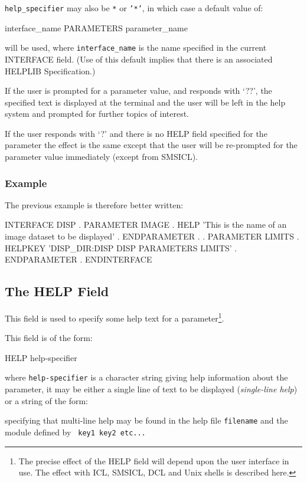 \documentclass[twoside,11pt,nolof]{starlink}
\begin{document}
\texttt{help\_specifier}  may also be \texttt{*} or \texttt{'*'}, in which case a
default value of:
\begin{terminalv}
interface_name PARAMETERS parameter_name
\end{terminalv}
will be used, where \texttt{interface\_name} is the name specified in the
current INTERFACE field.
(Use of this default implies that there is an associated HELPLIB Specification.)

If the user is prompted for a parameter value, and responds with `??',
the specified text is displayed at the terminal and the user will be left in
the help system and prompted for further topics of interest.

If the user responds with `?' and there is no HELP field specified for the
parameter the effect is the same except that the user
will be re-prompted for the parameter value immediately (except from SMSICL).

\subsubsection*{Example}
The previous example is therefore better written:
\begin{terminalv}
INTERFACE DISP
   .
   PARAMETER IMAGE
         .
      HELP 'This is the name of an image dataset to be displayed'
         .
   ENDPARAMETER
      .
      .
   PARAMETER LIMITS
         .
      HELPKEY 'DISP_DIR:DISP DISP PARAMETERS LIMITS'
         .
   ENDPARAMETER
      .
ENDINTERFACE
\end{terminalv}

\subsection{The HELP Field}

This field is used to specify some help text for a parameter\footnote{
The precise effect of the HELP field will depend upon the user interface in use.
The effect with ICL, SMSICL, DCL and Unix shells is described here.}.

This field is of the form:
\begin{terminalv}
HELP help-specifier
\end{terminalv}
where \texttt{help-specifier} is a character string giving help information about
the parameter, it may be either a single line of text to be displayed
(\emph{single-line help}) or a string of the form:
\begin{terminalv}
\end{terminalv}
specifying that multi-line help may be found in the help file
\texttt{filename} and the module defined by \texttt{ key1 key2 etc...}
\end{document}

